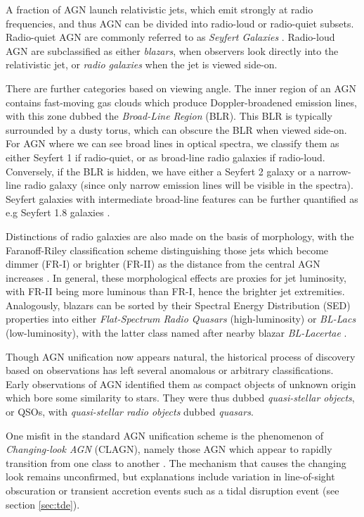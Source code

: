 A fraction of AGN launch relativistic jets, which emit strongly at radio frequencies, and thus AGN can be divided into radio-loud or radio-quiet subsets. Radio-quiet AGN are commonly referred to as \emph{Seyfert Galaxies} . Radio-loud AGN are subclassified as either \emph{blazars}, when observers look directly into the relativistic jet, or \emph{radio galaxies} when the jet is viewed side-on.

There are further categories based on viewing angle. The inner region of an AGN contains fast-moving gas clouds which produce Doppler-broadened emission lines, with this zone dubbed the \emph{Broad-Line Region} (BLR). This BLR is typically surrounded by a dusty torus, which can obscure the BLR when viewed side-on. For AGN where we can see broad lines in optical spectra, we classify them as either Seyfert 1 if radio-quiet, or as broad-line radio galaxies if radio-loud. Conversely, if the BLR is hidden, we have either a Seyfert 2 galaxy or a narrow-line radio galaxy (since only narrow emission lines will be visible in the spectra). Seyfert galaxies with intermediate broad-line features can be further quantified as e.g Seyfert 1.8 galaxies .

Distinctions of radio galaxies are also made on the basis of morphology, with the Faranoff-Riley classification scheme distinguishing those jets which become dimmer (FR-I) or brighter (FR-II) as the distance from the central AGN increases . In general, these morphological effects are proxies for jet luminosity, with FR-II being more luminous than FR-I, hence the brighter jet extremities. Analogously, blazars can be sorted by their Spectral Energy Distribution (SED) properties into either \emph{Flat-Spectrum Radio Quasars} (high-luminosity) or \emph{BL-Lacs} (low-luminosity), with the latter class named after nearby blazar \emph{BL-Lacertae} .

Though AGN unification now appears natural, the historical process of discovery based on observations has left several anomalous or arbitrary classifications. Early observations of AGN identified them as compact objects of unknown origin which bore some similarity to stars. They were thus dubbed \emph{quasi-stellar objects}, or QSOs, with \emph{quasi-stellar radio objects} dubbed \emph{quasars}. 

One misfit in the standard AGN unification scheme is the phenomenon of \emph{Changing-look AGN} (CLAGN), namely those AGN which appear to rapidly transition from one class to another . The mechanism that causes the changing look remains unconfirmed, but explanations include variation in line-of-sight obscuration or transient accretion events such as a tidal disruption event (see section \ref{sec:tde}).

